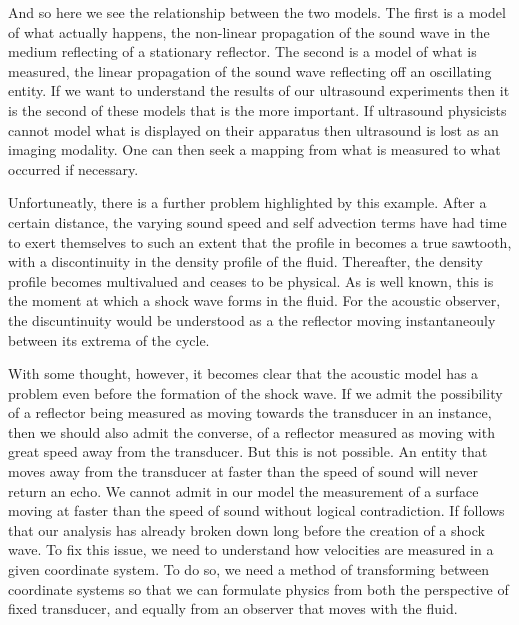 And so here we see the relationship between the two models.
The first is a model of what actually happens,
the non-linear propagation of the sound wave in the medium reflecting of a stationary reflector.
The second is a model of what is measured,
the linear propagation of the sound wave reflecting off an oscillating entity.
If we want to understand the results of our ultrasound experiments then it is the second of these models that is the more important.
%
If ultrasound physicists cannot model what is displayed on their apparatus then ultrasound is lost as an imaging modality.
One can then seek a mapping from what is measured to what occurred if necessary.
%

Unfortuneatly, there is a further problem highlighted by this example.
After a certain distance,
the varying sound speed and self advection terms have had time to exert themselves to such an extent that the profile in
 becomes a true sawtooth, with a discontinuity in the density profile of the fluid.
Thereafter, the density profile becomes multivalued and ceases to be physical.
As is well known,
this is the moment at which a shock wave forms in the fluid.
For the acoustic observer, the discuntinuity would be understood as a the reflector moving instantaneouly between
its extrema of the cycle.

With some thought, however, it becomes clear that the acoustic model has a problem even before the formation of the shock wave.
If we admit the possibility of a reflector being measured as moving towards the transducer in an instance,
then we should also admit the converse, of a reflector measured as moving with great speed away from the transducer.
But this is not possible. 
An entity that moves away from the transducer at faster than the speed of sound will never return an echo.
We cannot admit in our model the measurement of a surface moving at faster than the speed of sound
without logical contradiction.
If follows that our analysis has already broken down long before the creation of a shock wave. 
To fix this issue, we need to understand how velocities are measured in a given coordinate system.
To do so, we need a method of transforming between coordinate systems so that we can formulate physics from both the perspective of
fixed transducer, and equally from an observer that moves with the fluid.



